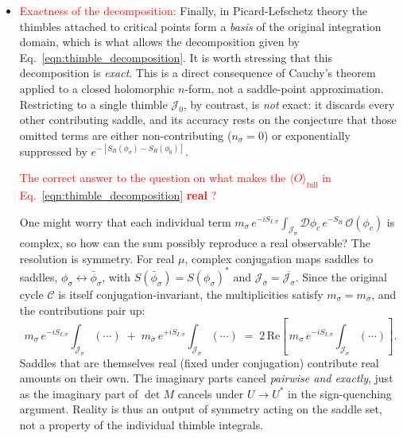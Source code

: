 \documentclass[11pt]{article}
\theoremstyle{definition}
\begin{document}
\begin{itemize}
        the saddle and the integral converges automatically. 
 \item \textcolor{red}{Exactness of the decomposition:} Finally, in
        Picard-Lefschetz theory the thimbles attached to critical points
        form a \emph{basis} of the original integration domain, which is what
        allows the decomposition given by Eq.~\eqref{eqn:thimble_decomposition}. It is worth stressing
        that this decomposition is \emph{exact}. This is a direct consequence
        of Cauchy's theorem applied to a closed holomorphic $n$-form, not a
        saddle-point approximation. Restricting to a single thimble
        $\mathcal{J}_0$, by contrast, is \emph{not} exact: it discards every
        other contributing saddle, and its accuracy rests on the conjecture
        that those omitted terms are either non-contributing
        ($n_\sigma = 0$) or exponentially suppressed by
        $e^{-[S_R(\phi_\sigma) - S_R(\phi_0)]}$.

        \textcolor{red}{The correct answer to the question on what makes the $\langle O \rangle_{\mathrm{full}}$ in Eq.~\eqref{eqn:thimble_decomposition} \textbf{real} ?}

        One might worry that each individual term $m_\sigma\,
        e^{-iS_{I,\sigma}}\!\int_{\mathcal{J}_\sigma} \mathcal{D}\phi_c\,
        e^{-S_R}\,\mathcal{O}(\phi_c)$ is complex, so how can the sum
        possibly reproduce a real observable? The resolution is symmetry.
        For real $\mu$, complex conjugation maps saddles to saddles,
        $\phi_\sigma \leftrightarrow \bar\phi_\sigma$, with
        $S(\bar\phi_\sigma) = S(\phi_\sigma)^*$ and
        $\mathcal{J}_{\bar\sigma} = \overline{\mathcal{J}_\sigma}$. Since
        the original cycle $\mathcal{C}$ is itself conjugation-invariant,
        the multiplicities satisfy $m_\sigma = m_{\bar\sigma}$, and the
        contributions pair up:
        \begin{equation*}
          m_\sigma\, e^{-iS_{I,\sigma}}\!\!\int_{\mathcal{J}_\sigma}(\cdots)
          \;+\; m_{\bar\sigma}\, e^{+iS_{I,\sigma}}\!\!
          \int_{\mathcal{J}_{\bar\sigma}}(\cdots)
          \;=\; 2\,\mathrm{Re}\!\left[\,m_\sigma\, e^{-iS_{I,\sigma}}\!\!
          \int_{\mathcal{J}_\sigma}(\cdots)\right] .
        \end{equation*}
        Saddles that are themselves real (fixed under conjugation)
        contribute real amounts on their own. The imaginary parts cancel
        \emph{pairwise and exactly}, just as the imaginary part of $\det M$
        cancels under $U \to U^*$ in the sign-quenching argument. Reality is
        thus an output of symmetry acting on the saddle set, not a property
        of the individual thimble integrals.
\end{itemize}
\end{document}
